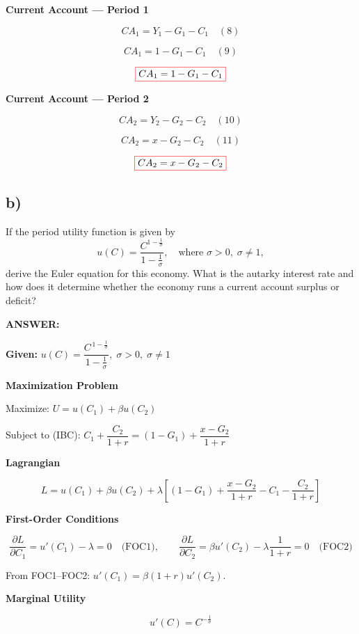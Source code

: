 \documentclass[12pt]{article}
\begin{document}
\textbf{Current Account — Period 1}

\[
CA_1 = Y_1 - G_1 - C_1 \quad (8)
\]

\[
CA_1 = 1 - G_1 - C_1 \quad (9)
\]

\[
\fcolorbox{red}{white}{$
\displaystyle
CA_1 = 1 - G_1 - C_1
$}
\]

\textbf{Current Account — Period 2}

\[
CA_2 = Y_2 - G_2 - C_2 \quad (10)
\]

\[
CA_2 = x - G_2 - C_2 \quad (11)
\]

\[
\fcolorbox{red}{white}{$
\displaystyle
CA_2 = x - G_2 - C_2
$}
\]

\subsection*{\noindent\textbf{b)}}

If the period utility function is given by 
\[
u(C) = \frac{C^{1-\tfrac{1}{\sigma}}}{1 - \tfrac{1}{\sigma}}, 
\quad \text{where } \sigma > 0, \; \sigma \neq 1,
\]
derive the Euler equation for this economy. What is the autarky interest rate and how does it determine whether the economy runs a current account surplus or deficit?


\vspace{0.5em}
\noindent\textcolor{formalred}{\textbf{ANSWER:}}

\textbf{Given:} \(
u(C)=\dfrac{C^{\,1-\tfrac{1}{\sigma}}}{1-\tfrac{1}{\sigma}},\;
\sigma>0,\; \sigma \neq 1
\)

\textbf{Maximization Problem}

Maximize: \(
U = u(C_1) + \beta u(C_2)
\)

Subject to (IBC): \(
C_1 + \dfrac{C_2}{1+r} = (1-G_1) + \dfrac{x-G_2}{1+r}
\)

\textbf{Lagrangian}

\[
L = u(C_1) + \beta u(C_2) + \lambda\!\left[(1-G_1) + \frac{x-G_2}{1+r} - C_1 - \frac{C_2}{1+r}\right]
\]

\textbf{First-Order Conditions}

\[
\frac{\partial L}{\partial C_1} = u'(C_1) - \lambda = 0 \quad\text{(FOC1)}, \qquad
\frac{\partial L}{\partial C_2} = \beta u'(C_2) - \lambda\frac{1}{1+r} = 0 \quad\text{(FOC2)}
\]

From FOC1–FOC2: \(u'(C_1) = \beta(1+r)u'(C_2)\).

\textbf{Marginal Utility}

\[
u'(C) = C^{-\tfrac{1}{\sigma}}
\]
\end{document}
